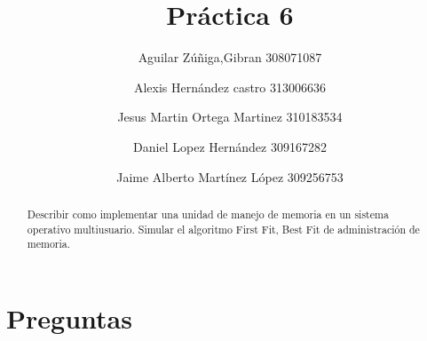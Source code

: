 \documentclass[a4paperx]{article}
\begin{document}
\title{Pr\'actica 6}
\author{
Aguilar Z\'u\~niga,Gibran 308071087 \and  Alexis Hernández castro 313006636 \and Jesus Martin Ortega Martinez 310183534 \and Daniel Lopez Hernández 309167282 \and Jaime Alberto Martínez López 309256753
}

\maketitle

\begin{abstract}
Describir como implementar una unidad de manejo de memoria en un
sistema operativo multiusuario. Simular el algoritmo First Fit, Best Fit de administraci\'on de memoria.
\end{abstract}

\section{Preguntas}
\end{document}
